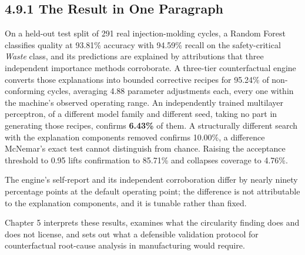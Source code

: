 \hypertarget{the-result-in-one-paragraph}{%
\subsection{4.9.1 The Result in One Paragraph}\label{the-result-in-one-paragraph}}

On a held-out test split of 291 real injection-molding cycles, a Random Forest classifies quality at 93.81\% accuracy with 94.59\% recall on the safety-critical \emph{Waste} class, and its predictions are explained by attributions that three independent importance methods corroborate. A three-tier counterfactual engine converts those explanations into bounded corrective recipes for 95.24\% of non-conforming cycles, averaging 4.88 parameter adjustments each, every one within the machine's observed operating range. An independently trained multilayer perceptron, of a different model family and different seed, taking no part in generating those recipes, confirms \textbf{6.43\%} of them. A structurally different search with the explanation components removed confirms 10.00\%, a difference McNemar's exact test cannot distinguish from chance. Raising the acceptance threshold to 0.95 lifts confirmation to 85.71\% and collapses coverage to 4.76\%.

The engine's self-report and its independent corroboration differ by nearly ninety percentage points at the default operating point; the difference is not attributable to the explanation components, and it is tunable rather than fixed.

Chapter 5 interprets these results, examines what the circularity finding does and does not license, and sets out what a defensible validation protocol for counterfactual root-cause analysis in manufacturing would require.
